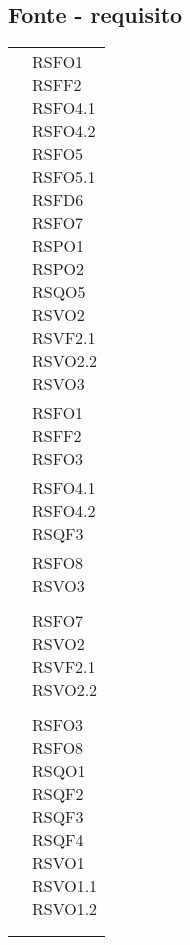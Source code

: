 {{{{{\subsection{Fonte - requisito}\label{RequisitiTracciamentoDeiRequisitiFonteRequisito}
\def\tabularxcolumn#1{m{#1}}
{
	\begin{center}
		\renewcommand{\arraystretch}{1.4}
		\begin{longtable}{|p{7.5cm}|p{7.5cm}|}
		\hline
		\rowcolor{airforceblue}
		\makecell[c]{\textbf{Fonte}} & \makecell[c]{\textbf{Codice RS}}  \\
		\hline
		\makecell[c]{Capitolato$_{\scaleto{G}{3pt}}$} & \makecell[c]{RSFO1\\RSFF2\\RSFO4.1\\RSFO4.2\\RSFO5\\RSFO5.1\\RSFD6\\RSFO7\\RSPO1\\RSPO2\\RSQO5\\RSVO2\\RSVF2.1\\RSVO2.2\\RSVO3} \\
		\hline
		\makecell[c]{FC1.1} & \makecell[c]{RSFO1 \\ RSFF2 \\ RSFO3} \\
		\hline
		\makecell[c]{FC1.2} & \makecell[c]{RSFO4.1 \\ RSFO4.2 \\ RSQF3} \\
		\hline
		\makecell[c]{FC1.3} & \makecell[c]{RSFO8 \\ RSVO3} \\
		\hline
		\makecell[c]{FC2} & \makecell[c]{RSFD6} \\
		\hline
		\makecell[c]{FC3.1} & \makecell[c]{RSFO7 \\ RSVO2\\RSVF2.1\\RSVO2.2} \\
		\hline
		\makecell[c]{FC3.2} & \makecell[c]{RSVO4} \\
		\hline
		\makecell[c]{Interno} &\makecell[c]{RSFO3\\RSFO8\\RSQO1\\RSQF2\\RSQF3\\RSQF4\\RSVO1\\RSVO1.1\\RSVO1.2} \\
		\hline
		\makecell[c]{Verbale esterno 17-12-2020} & \makecell[c]{RSFO1} \\
		\hline
		\rowcolor{white}


\end{longtable}
\end{center}}}}}}}
